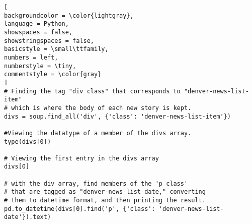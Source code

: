 \documentclass[]{article}
\begin{document}
\begin{lstlisting}[
backgroundcolor = \color{lightgray},
language = Python,
showspaces = false,
showstringspaces = false,
basicstyle = \small\ttfamily,
numbers = left,
numberstyle = \tiny,
commentstyle = \color{gray}
]
# Finding the tag "div class" that corresponds to "denver-news-list-item"
# which is where the body of each new story is kept. 
divs = soup.find_all('div', {'class': 'denver-news-list-item'})

#Viewing the datatype of a member of the divs array.
type(divs[0])

# Viewing the first entry in the divs array
divs[0]

# with the div array, find members of the 'p class' 
# that are tagged as "denver-news-list-date," converting
# them to datetime format, and then printing the result.
pd.to_datetime(divs[0].find('p', {'class': 'denver-news-list-date'}).text)
\end{lstlisting}
\end{document}
